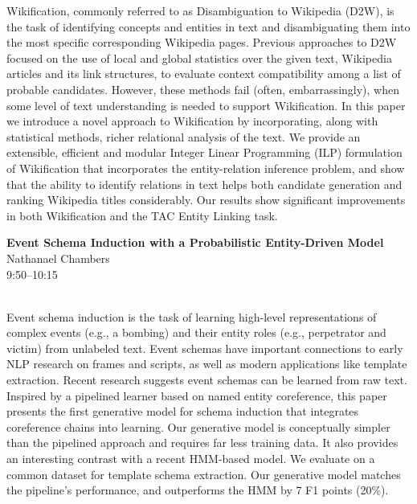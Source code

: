 \documentclass[twoside,makeidx]{book}
\begin{document}
{\small Wikification, commonly referred to as Disambiguation to Wikipedia (D2W), is the task of identifying concepts and entities in text and disambiguating them into the most specific corresponding Wikipedia pages. Previous approaches to D2W focused on the use of local and global statistics over the given text, Wikipedia articles and its link structures, to evaluate context compatibility among a list of probable candidates. However, these methods fail (often, embarrassingly), when some level of text understanding is needed to support Wikification. In this paper we introduce a novel approach to Wikification by incorporating, along with statistical methods, richer relational analysis of the text. We provide an extensible, efficient and modular Integer Linear Programming (ILP) formulation of Wikification that incorporates the entity-relation inference problem, and show that the ability to identify relations in text helps both candidate generation and ranking Wikipedia titles considerably. Our results show significant improvements in both Wikification and the TAC Entity Linking task.}
\par\vspace{2em}\noindent%
\begin{minipage}{\linewidth}%
\begin{center}
\textbf{\normalsize Event Schema Induction with a Probabilistic Entity-Driven Model}\\
\normalsize  Nathanael Chambers\\
{\small 9:50--10:15}\\
\end{center}
\end{minipage}\\[0.5em]
\nopagebreak%
\noindent%
{\small Event schema induction is the task of learning high-level representations of complex events (e.g., a bombing) and their entity roles (e.g., perpetrator and victim) from unlabeled text. Event schemas have important connections to early NLP research on frames and scripts, as well as modern applications like template extraction. Recent research suggests event schemas can be learned from raw text. Inspired by a pipelined learner based on named entity coreference, this paper presents the first generative model for schema induction that integrates coreference chains into learning. Our generative model is conceptually simpler than the pipelined approach and requires far less training data. It also provides an interesting contrast with a recent HMM-based model. We evaluate on a common dataset for template schema extraction. Our generative model matches the pipeline's performance, and outperforms the HMM by 7 F1 points (20\%).}
\end{document}
